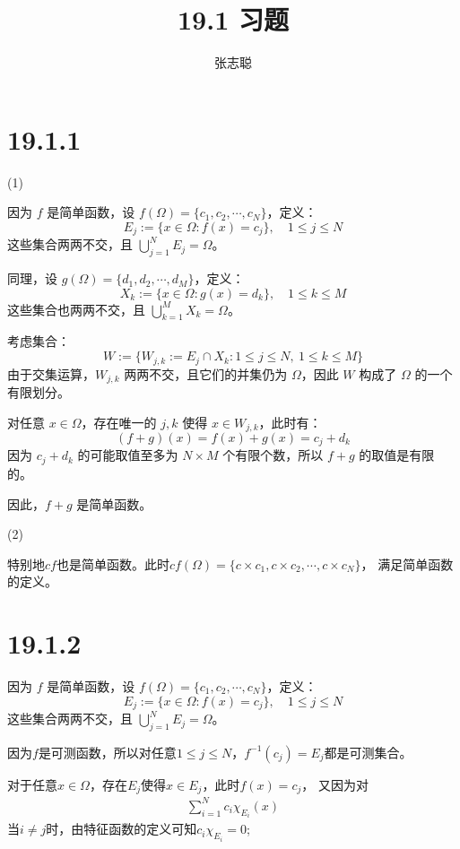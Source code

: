 \documentclass{article}
\begin{document}
\title{19.1 习题}
\author{张志聪}
\maketitle

\section*{19.1.1}

 (1)

因为 $f$ 是简单函数，设 $f(\Omega) = \{c_1, c_2, \cdots, c_N\}$，定义：
\[
  E_j := \{x \in \Omega : f(x) = c_j\}, \quad 1 \leq j \leq N
\]
这些集合两两不交，且 $\bigcup_{j=1}^N E_j = \Omega$。

同理，设 $g(\Omega) = \{d_1, d_2, \cdots, d_M\}$，定义：
\[
  X_k := \{x \in \Omega : g(x) = d_k\}, \quad 1 \leq k \leq M
\]
这些集合也两两不交，且 $\bigcup_{k=1}^M X_k = \Omega$。

考虑集合：
\[
  W := \{W_{j,k} := E_j \cap X_k : 1 \leq j \leq N,\ 1 \leq k \leq M\}
\]
由于交集运算，$W_{j,k}$ 两两不交，且它们的并集仍为 $\Omega$，因此 $W$ 构成了 $\Omega$ 的一个有限划分。

对任意 $x \in \Omega$，存在唯一的 $j,k$ 使得 $x \in W_{j,k}$，此时有：
\[
  (f + g)(x) = f(x) + g(x) = c_j + d_k
\]
因为 $c_j + d_k$ 的可能取值至多为 $N \times M$ 个有限个数，所以 $f + g$ 的取值是有限的。

因此，$f + g$ 是简单函数。

(2)

特别地$cf$也是简单函数。此时$cf(\Omega) = \{c \times c_1, c \times c_2, \cdots,c \times c_N\}$，
满足简单函数的定义。

\section*{19.1.2}

因为 $f$ 是简单函数，设 $f(\Omega) = \{c_1, c_2, \cdots, c_N\}$，定义：
\[
  E_j := \{x \in \Omega : f(x) = c_j\}, \quad 1 \leq j \leq N
\]
这些集合两两不交，且 $\bigcup_{j=1}^N E_j = \Omega$。

因为$f$是可测函数，所以对任意$1 \leq j \leq N$，$f^{-1}(c_j) = E_j$都是可测集合。

对于任意$x \in \Omega$，存在$E_j$使得$x \in E_j$，此时$f(x) = c_j$，
又因为对
\begin{align*}
  \sum \limits_{i = 1}^N c_i \chi_{E_i} (x)
\end{align*}
当$i \neq j$时，由特征函数的定义可知$c_i \chi_{E_i} = 0 $;
\end{document}
